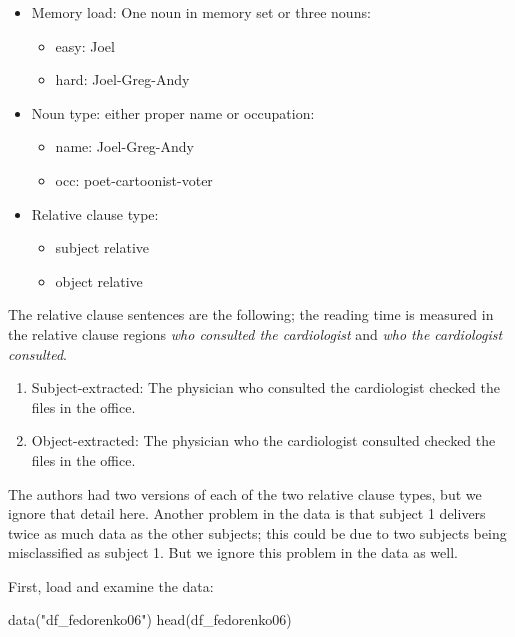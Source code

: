 \documentclass[
  12pt,
]{krantz}
\newenvironment{Shaded}{\begin{snugshade}}{\end{snugshade}}
\newcommand{\FunctionTok}[1]{\textcolor[rgb]{0.00,0.00,0.00}{#1}}
\newcommand{\NormalTok}[1]{#1}
\newcommand{\StringTok}[1]{\textcolor[rgb]{0.31,0.60,0.02}{#1}}
\providecommand{\tightlist}{%
  \setlength{\itemsep}{0pt}\setlength{\parskip}{0pt}}
\theoremstyle{definition}
\theoremstyle{definition}
\theoremstyle{definition}
\theoremstyle{definition}
\theoremstyle{remark}
\begin{document}
\begin{itemize}
\tightlist
\item
  Memory load: One noun in memory set or three nouns:

  \begin{itemize}
  \tightlist
  \item
    easy: Joel
  \item
    hard: Joel-Greg-Andy
  \end{itemize}
\item
  Noun type: either proper name or occupation:

  \begin{itemize}
  \tightlist
  \item
    name: Joel-Greg-Andy
  \item
    occ: poet-cartoonist-voter
  \end{itemize}
\item
  Relative clause type:

  \begin{itemize}
  \tightlist
  \item
    subject relative
  \item
    object relative
  \end{itemize}
\end{itemize}

The relative clause sentences are the following; the reading time is measured in the relative clause regions \emph{who consulted the cardiologist} and \emph{who the cardiologist consulted}.

\begin{enumerate}
\def\labelenumi{(\arabic{enumi})}
\item
  Subject-extracted:
  The physician \textbar{} who consulted the cardiologist \textbar{} checked the files \textbar{} in the office.
\item
  Object-extracted:
  The physician \textbar{} who the cardiologist consulted \textbar{} checked the files \textbar{} in the office.
\end{enumerate}

The authors had two versions of each of the two relative clause types, but we ignore that detail here. Another problem in the data is that subject 1 delivers twice as much data as the other subjects; this could be due to two subjects being misclassified as subject 1. But we ignore this problem in the data as well.

First, load and examine the data:

\begin{Shaded}
\begin{Highlighting}[]
\FunctionTok{data}\NormalTok{(}\StringTok{"df\_fedorenko06"}\NormalTok{)}
\FunctionTok{head}\NormalTok{(df\_fedorenko06)}
\end{Highlighting}
\end{Shaded}
\end{document}

